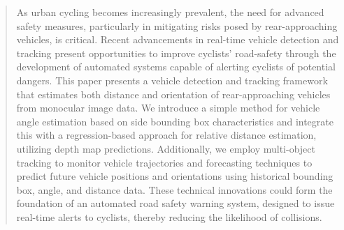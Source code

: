 %
\begin{abstract}
\addchaptertocentry{\abstractname} %

As urban cycling becomes increasingly prevalent, the need for advanced safety measures, particularly in mitigating risks posed by rear-approaching vehicles, is critical. Recent advancements in real-time vehicle detection and tracking present opportunities to improve cyclists' road-safety through the development of automated systems capable of alerting cyclists of potential dangers. This paper presents a vehicle detection and tracking framework that estimates both distance and orientation of rear-approaching vehicles from monocular image data. We introduce a simple method for vehicle angle estimation based on side bounding box characteristics and integrate this with a regression-based approach for relative distance estimation, utilizing depth map predictions. Additionally, we employ multi-object tracking to monitor vehicle trajectories and forecasting techniques to predict future vehicle positions and orientations using historical bounding box, angle, and distance data. These technical innovations could form the foundation of an automated road safety warning system, designed to issue real-time alerts to cyclists, thereby reducing the likelihood of collisions. 
\end{abstract}